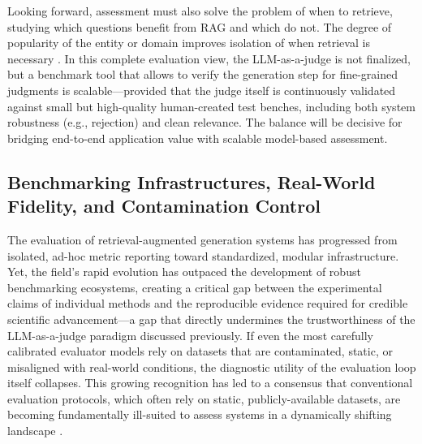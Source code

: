 \documentclass[11pt,a4paper]{article}
\begin{document}
Looking forward, assessment must also solve the problem of when to retrieve, studying which questions benefit from RAG and which do not. The degree of popularity of the entity or domain improves isolation of when retrieval is necessary \cite{arxiv:2212.10511v4}. In this complete evaluation view, the LLM-as-a-judge is not finalized, but a benchmark tool that allows to verify the generation step for fine-grained judgments is scalable---provided that the judge itself is continuously validated against small but high-quality human-created test benches, including both system robustness (e.g., rejection) and clean relevance. The balance will be decisive for bridging end-to-end application value with scalable model-based assessment.


\subsection{Benchmarking Infrastructures, Real-World Fidelity, and Contamination Control}


The evaluation of retrieval-augmented generation systems has progressed from isolated, ad-hoc metric reporting toward standardized, modular infrastructure. Yet, the field's rapid evolution has outpaced the development of robust benchmarking ecosystems, creating a critical gap between the experimental claims of individual methods and the reproducible evidence required for credible scientific advancement---a gap that directly undermines the trustworthiness of the LLM-as-a-judge paradigm discussed previously. If even the most carefully calibrated evaluator models rely on datasets that are contaminated, static, or misaligned with real-world conditions, the diagnostic utility of the evaluation loop itself collapses. This growing recognition has led to a consensus that conventional evaluation protocols, which often rely on static, publicly-available datasets, are becoming fundamentally ill-suited to assess systems in a dynamically shifting landscape \cite{arxiv:2312.10997v5,arxiv:2405.06211v3}.
\end{document}
